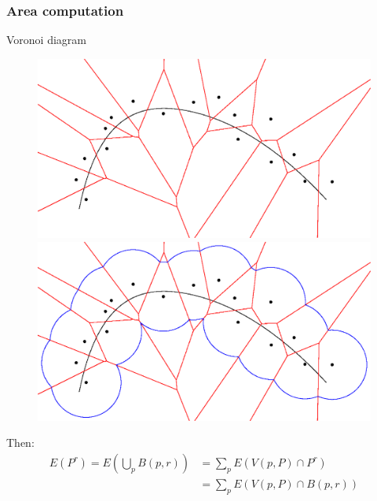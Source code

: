 \documentclass{beamer}
\begin{document}
\begin{frame}
    \frametitle{Area computation}

    Voronoi diagram 
    \begin{figure}
        \centering
        \includegraphics[scale=0.28]{img/voronoi-curve-2d}
        \hspace{1cm}
        \includegraphics[scale=0.28]{img/voronoi-offset-2d}
    \end{figure}

    Then:
    \begin{align*}
        E(P^r) = E \left( \bigcup_p B(p, r) \right) &= \sum_p E(V(p, P) \cap P^r) \\
        &= \sum_p E(V(p, P) \cap B(p, r)) \\
    \end{align*}
\end{frame}
\end{document}
